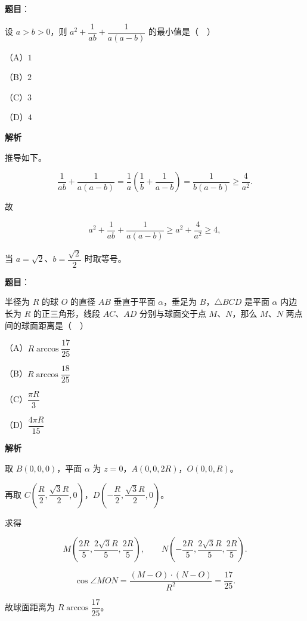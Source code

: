 \begin{answer}

\textbf{题目}：

设 $a>b>0$，则 $a^2+\dfrac1{ab}+\dfrac1{a(a-b)}$ 的最小值是（　）

（A）$1$

（B）$2$

（C）$3$

（D）$4$

\textbf{解析}

推导如下。

\nopagebreak[4]
\[\frac1{ab}+\frac1{a(a-b)}
=\frac1a\left(\frac1b+\frac1{a-b}\right)
=\frac1{b(a-b)}\geqslant\frac4{a^2}.\]

故

\nopagebreak[4]
\[a^2+\frac1{ab}+\frac1{a(a-b)}\geqslant a^2+\frac4{a^2}\geqslant4,\]

当 $a=\sqrt2$、$b=\dfrac{\sqrt2}2$ 时取等号。


\end{answer}
\begin{answer}

\textbf{题目}：

半径为 $R$ 的球 $O$ 的直径 $AB$ 垂直于平面 $\alpha$，垂足为 $B$，$\triangle BCD$ 是平面 $\alpha$ 内边长为 $R$ 的正三角形，线段 $AC$、$AD$ 分别与球面交于点 $M$、$N$，那么 $M$、$N$ 两点间的球面距离是（　）

（A）$R\arccos\dfrac{17}{25}$

（B）$R\arccos\dfrac{18}{25}$

（C）$\dfrac{\pi R}3$

（D）$\dfrac{4\pi R}{15}$

\textbf{解析}

取 $B(0,0,0)$，平面 $\alpha$ 为 $z=0$，$A(0,0,2R)$，$O(0,0,R)$。

再取 $C\left(\dfrac R2,\dfrac{\sqrt3R}2,0\right)$，$D\left(-\dfrac R2,\dfrac{\sqrt3R}2,0\right)$。

求得

\nopagebreak[4]
\[M\left(\dfrac{2R}5,\dfrac{2\sqrt3R}5,\dfrac{2R}5\right),\qquad
N\left(-\dfrac{2R}5,\dfrac{2\sqrt3R}5,\dfrac{2R}5\right).\]

\nopagebreak[4]
\[\cos\angle MON=\frac{(M-O)\cdot(N-O)}{R^2}=\frac{17}{25}.\]

故球面距离为 $R\arccos\dfrac{17}{25}$。


\end{answer}
